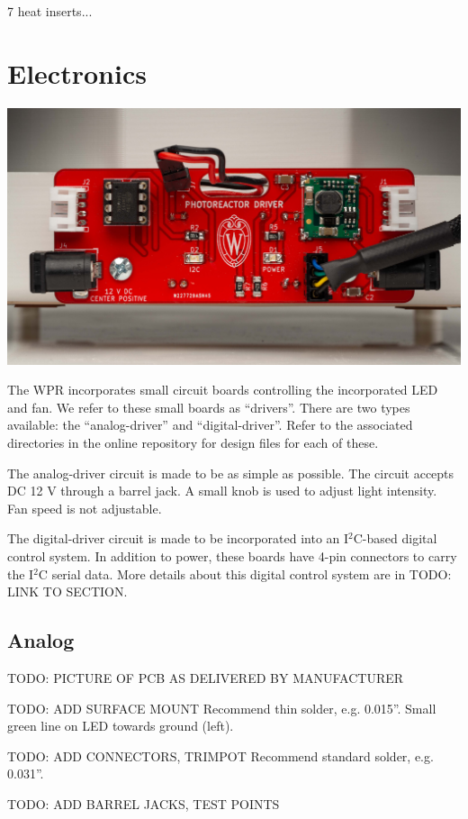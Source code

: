 \documentclass[11pt]{article}
\let\stdsection\section
\renewcommand\section{\clearpage\stdsection}
\begin{document}
7 heat inserts...

\section{Electronics}

\includegraphics[width=\textwidth]{"./electronics-coverart.jpg"}

The WPR incorporates small circuit boards controlling the incorporated LED and fan.
We refer to these small boards as ``drivers''.
There are two types available: the ``analog-driver'' and ``digital-driver''.
Refer to the associated directories in the online repository for design files for each of these.

The analog-driver circuit is made to be as simple as possible.
The circuit accepts DC 12 V through a barrel jack.
A small knob is used to adjust light intensity.
Fan speed is not adjustable.

The digital-driver circuit is made to be incorporated into an I$^2$C-based digital control system.
In addition to power, these boards have 4-pin connectors to carry the I$^2$C serial data.
More details about this digital control system are in TODO: LINK TO SECTION.

\clearpage
\subsection{Analog}

TODO: PICTURE OF PCB AS DELIVERED BY MANUFACTURER

TODO: ADD SURFACE MOUNT
Recommend thin solder, e.g. 0.015''.
Small green line on LED towards ground (left).

TODO: ADD CONNECTORS, TRIMPOT
Recommend standard solder, e.g. 0.031''.

TODO: ADD BARREL JACKS, TEST POINTS
\end{document}
